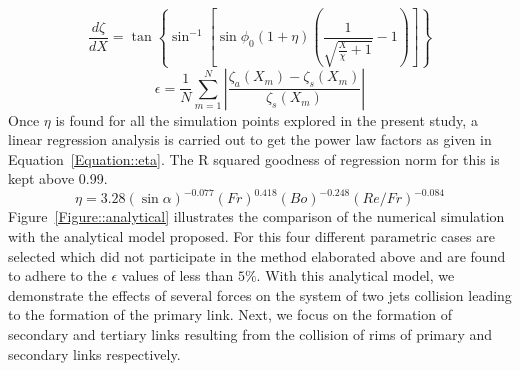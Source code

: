 \documentclass[%
aip,
sd,%
amsmath,amssymb,
preprint,%
author-year,%
]{revtex4-1}
\begin{document}
\begin{equation}
\label{Equation::AnaFinal}
\frac{d\zeta}{dX} = \tan\left\lbrace\sin^{-1}\left[ \sin\phi_0\left(1 + \eta\right)\left(\frac{1}{\sqrt{\frac{X}{\chi} + 1}} - 1\right) \right]\right\rbrace
\end{equation}
\begin{equation}\label{Equation::L1}
\epsilon = \frac{1}{N}\sum_{m = 1}^{N}\left|\frac{\zeta_a(X_m) - \zeta_s(X_m)}{\zeta_s(X_m)}\right|
\end{equation}
Once $\eta$ is found for all the simulation points explored in the present study, a linear regression analysis is carried out to get the power law factors as given in Equation~\ref{Equation::eta}. The R squared goodness of regression norm for this is kept above 0.99. \begin{equation}\label{Equation::eta}
\eta = 3.28(\sin\alpha)^{-0.077}(Fr)^{0.418}(Bo)^{-0.248}\left(Re/Fr\right)^{-0.084}
\end{equation}
Figure~\ref{Figure::analytical} illustrates the comparison of the numerical simulation with the analytical model proposed. For this four different parametric cases are selected which did not participate in the method elaborated above and are found to adhere to the $\epsilon$ values of less than $5\%$. With this analytical model, we demonstrate the effects of several forces on the system of two jets collision leading to the formation of the primary link. Next, we focus on the formation of secondary and tertiary links resulting from the collision of rims of primary and secondary links respectively.
\end{document}
